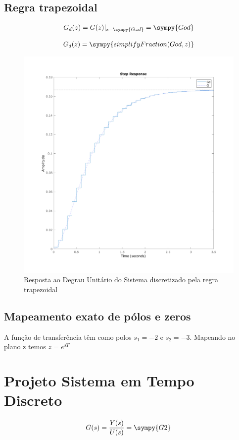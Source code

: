 \documentclass[a4paper,11pt]{article}
\begin{document}
\subsection{Regra trapezoidal}

$$
G_d(z) =  G(z)|_{s = \sympy{Gzd}} = \sympy{God}
$$

\begin{equation}
    G_d(z) = \sympy{simplifyFraction(God,z)}
\end{equation}

\begin{figure}[H]
    \centering
    \includegraphics[width=0.8\linewidth]{img/exsim2-plot-g-trap.png}
    \caption{Resposta ao Degrau Unitário do Sistema discretizado pela regra trapezoidal}
\end{figure}

\subsection{Mapeamento exato de pólos e zeros}

A função de transferência têm como polos $s_1=-2$ e $s_2=-3$. Mapeando no plano z temos $z = e^{sT}$

\section{Projeto Sistema em Tempo Discreto}

\begin{equation}
    G(s) = \frac{Y(s)}{U(s)} = \sympy{G2}
\end{equation}
\end{document}
